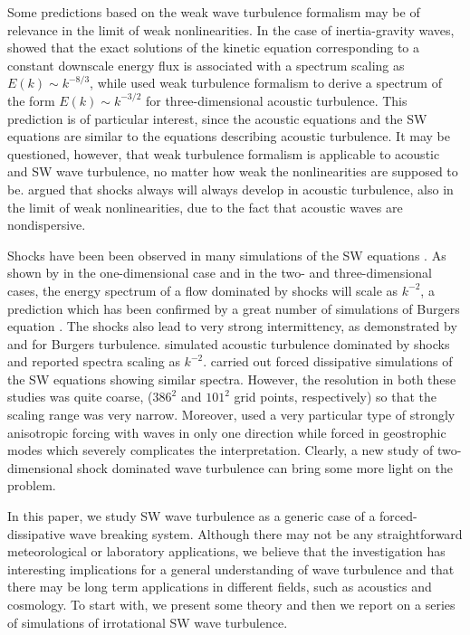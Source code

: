 \documentclass{jfm}
\begin{document}
Some predictions  based on the weak wave turbulence formalism
\cite[]{ZakharovLvovFalkovich1992, Nazarenko2011} may be of relevance in the limit of weak nonlinearities. In the case of
inertia-gravity waves, \cite{FalkovichMedvedev1992} showed that the exact
solutions of the kinetic equation corresponding to a constant downscale energy
flux is associated with a spectrum scaling as $E(k) \sim k^{-8/3}$, while
\cite{ZakharovSagdeev1970} used weak turbulence formalism to derive a spectrum
of the form $ E(k) \sim k^{-3/2} $ for three-dimensional acoustic turbulence. This prediction is
of particular interest, since the acoustic equations and the SW equations are similar 
to the equations describing acoustic turbulence. It may be questioned, however, that weak turbulence formalism is
applicable to acoustic and SW wave turbulence, no matter how weak the
nonlinearities are supposed to be.  \cite{KadomtsevPet1973} argued that shocks always will always develop in acoustic turbulence, also in the limit of weak nonlinearities, due to the fact that acoustic waves are nondispersive.

Shocks have been been observed in many simulations of the SW equations \cite[]{FargeSadourny1989,
PolvaniMcWilliamsSpallFord1994, LahayeZeitlin2012}. As shown by \cite{Burgers1948} in the one-dimensional case and \cite{Kuznetsov2004} in the two- and three-dimensional cases, the energy spectrum of a flow dominated by
shocks will scale as $ k^{-2} $, a prediction which has been confirmed by a
great number of simulations of Burgers equation \cite[for a review, see ]
[]{Frisch2001}. The shocks also lead to very strong intermittency, as
demonstrated by \cite{BouchaudMezardParisi1995} and
\cite{WeinanKhaninMazelSinai1997} for Burgers turbulence.
%
\cite{FalkovichMeyer1996} simulated acoustic turbulence dominated by shocks
and reported spectra scaling as $ k^{-2} $.
\cite{YuanHamilton1994} carried out
forced dissipative simulations of the SW equations showing similar spectra.
However, the resolution in both these studies was quite coarse, ($386^2$
and $101^2$ grid points, respectively) so that the scaling range was very
narrow.  Moreover, \cite{FalkovichMeyer1996} used a very particular
type of strongly anisotropic forcing with waves in only one
direction while \cite{YuanHamilton1994} forced in geostrophic modes
which severely complicates the interpretation. Clearly, a new study of two-dimensional shock dominated wave turbulence can bring some more light on the problem. 

In this paper, we study SW wave turbulence as a generic case of a forced-dissipative wave breaking system. Although there may not be any straightforward meteorological or laboratory applications,  we believe that the investigation has interesting implications for a general understanding of wave turbulence and that there may be long term applications in different fields, such as acoustics and cosmology.  To start with, we present some theory and then we report on a series of simulations of irrotational SW wave turbulence.
\end{document}
